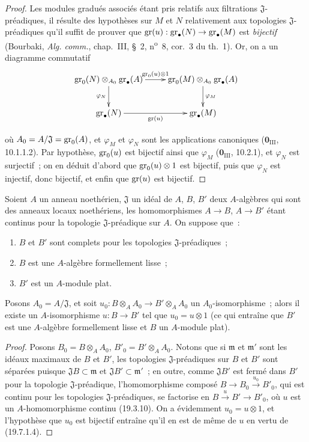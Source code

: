 \begin{proof}
Les modules gradués associés étant pris relatifs aux filtrations
$\mathfrak J$-préadiques, il résulte des hypothèses sur $M$ et $N$ relativement
aux topologies $\mathfrak J$-préadiques qu'il suffit de prouver que
$\operatorname{gr}(u):\operatorname{gr}_\bullet(N)\to\operatorname{gr}_\bullet(M)$ est \emph{bijectif} (Bourbaki,
\emph{Alg. comm.}, chap.~III, §~2, n\textsuperscript{o}~8, cor.~3 du th.~1).
Or, on a un diagramme commutatif
\[
\xymatrix{
  \gr_0(N)\otimes_{A_0}\gr_\bullet(A)
    \ar[r]^-{\gr_0(u)\otimes1}\ar[d]_{\varphi_N} &
  \gr_0(M)\otimes_{A_0}\gr_\bullet(A)\ar[d]^{\varphi_M} \\
  \gr_\bullet(N)\ar[r]_-{\gr(u)} & \gr_\bullet(M)
}
\]


où $A_0=A/\mathfrak J=\operatorname{gr}_0(A)$, et $\varphi_M$ et $\varphi_N$ sont les
applications canoniques ($\mathbf 0_{\mathrm{III}}$, 10.1.1.2). Par
hypothèse, $\operatorname{gr}_0(u)$ est bijectif ainsi que $\varphi_M$
($\mathbf 0_{\mathrm{III}}$, 10.2.1), et $\varphi_N$ est surjectif~; on en
déduit d'abord que $\operatorname{gr}_0(u)\otimes1$ est bijectif, puis que $\varphi_N$ est
injectif, donc bijectif, et enfin que $\operatorname{gr}(u)$ est bijectif.
\end{proof}

\begin{lemma}[19.7.1.5]
\label{0.19.7.1.5-fr}
Soient $A$ un anneau noethérien, $\mathfrak J$ un idéal de $A$, $B$, $B'$ deux
$A$-algèbres qui sont des anneaux locaux noethériens, les homomorphismes
$A\to B$, $A\to B'$ étant continus pour la topologie $\mathfrak J$-préadique
sur $A$. On suppose que~:
\begin{enumerate}
  \item[$1^{\mathrm o}$] $B$ et $B'$ sont complets pour les topologies
  $\mathfrak J$-préadiques~;
  \item[$2^{\mathrm o}$] $B$ est une $A$-algèbre formellement lisse~;
  \item[$3^{\mathrm o}$] $B'$ est un $A$-module plat.
\end{enumerate}
Posons $A_0=A/\mathfrak J$, et soit
$u_0:B\otimes_A A_0\to B'\otimes_A A_0$ un $A_0$-isomorphisme~; alors il
existe un $A$-isomorphisme $u:B\to B'$ tel que $u_0=u\otimes1$ (ce qui
entraîne que $B'$ est une $A$-algèbre formellement lisse et $B$ un $A$-module
plat).
\end{lemma}

\begin{proof}
Posons $B_0=B\otimes_A A_0$, $B'_0=B'\otimes_A A_0$. Notons que si
$\mathfrak m$ et $\mathfrak m'$ sont les idéaux maximaux de $B$ et $B'$, les
topologies $\mathfrak J$-préadiques sur $B$ et $B'$ sont séparées puisque
$\mathfrak JB\subset\mathfrak m$ et $\mathfrak JB'\subset\mathfrak m'$~; en
outre, comme $\mathfrak JB'$ est fermé dans $B'$ pour la topologie
$\mathfrak J$-préadique, l'homomorphisme composé
$B\to B_0\xrightarrow{u_0}B'_0$, qui est continu pour les topologies
$\mathfrak J$-préadiques, se factorise en $B\xrightarrow{u}B'\to B'_0$, où
$u$ est un $A$-homomorphisme continu (19.3.10). On a évidemment
$u_0=u\otimes1$, et l'hypothèse que $u_0$ est bijectif entraîne qu'il en est de
même de $u$ en vertu de (19.7.1.4).
\end{proof}

